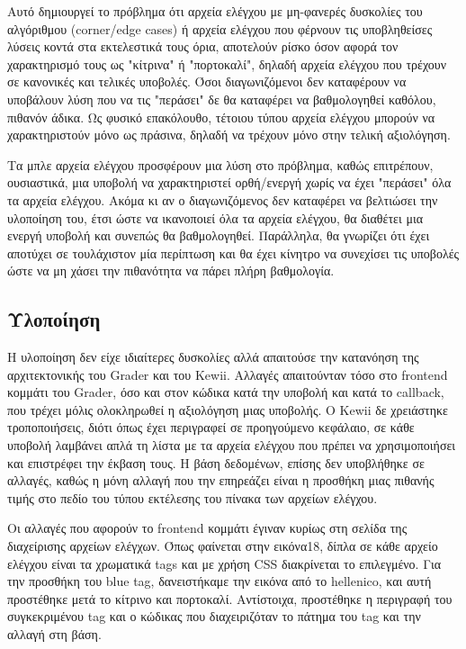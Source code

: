 \documentclass[diploma]{softlab-thesis}
\begin{document}
\bigskip

Αυτό δημιουργεί το πρόβλημα ότι αρχεία ελέγχου με μη-φανερές δυσκολίες του
αλγόριθμου (corner/edge cases) ή αρχεία ελέγχου που φέρνουν τις υποβληθείσες
λύσεις κοντά στα εκτελεστικά τους όρια, αποτελούν ρίσκο όσον αφορά τον
χαρακτηρισμό τους ως "κίτρινα" ή "πορτοκαλί", δηλαδή αρχεία ελέγχου που τρέχουν
σε κανονικές και τελικές υποβολές. Όσοι διαγωνιζόμενοι δεν καταφέρουν να
υποβάλουν λύση που να τις "περάσει" δε θα καταφέρει να βαθμολογηθεί καθόλου,
πιθανόν άδικα. Ως φυσικό επακόλουθο, τέτοιου τύπου αρχεία ελέγχου μπορούν να
χαρακτηριστούν μόνο ως πράσινα, δηλαδή να τρέχουν μόνο στην τελική αξιολόγηση.

\bigskip

Τα μπλε αρχεία ελέγχου προσφέρουν μια λύση στο πρόβλημα, καθώς επιτρέπουν,
ουσιαστικά, μια υποβολή να χαρακτηριστεί ορθή/ενεργή χωρίς να έχει "περάσει"
όλα τα αρχεία ελέγχου. Ακόμα κι αν ο διαγωνιζόμενος δεν καταφέρει να βελτιώσει
την υλοποίηση του, έτσι ώστε να ικανοποιεί όλα τα αρχεία ελέγχου, θα διαθέτει
μια ενεργή υποβολή και συνεπώς θα βαθμολογηθεί. Παράλληλα, θα γνωρίζει ότι
έχει αποτύχει σε τουλάχιστον μία περίπτωση και θα έχει κίνητρο να συνεχίσει τις
υποβολές ώστε να μη χάσει την πιθανότητα να πάρει πλήρη βαθμολογία.

\subsection{Υλοποίηση}

Η υλοποίηση δεν είχε ιδιαίτερες δυσκολίες αλλά απαιτούσε την κατανόηση της
αρχιτεκτονικής του Grader και του Kewii. Αλλαγές απαιτούνταν τόσο στο frontend
κομμάτι του Grader, όσο και στον κώδικα κατά την υποβολή και κατά το callback,
που τρέχει μόλις ολοκληρωθεί η αξιολόγηση μιας υποβολής. Ο Kewii δε χρειάστηκε
τροποποιήσεις, διότι όπως έχει περιγραφεί σε προηγούμενο κεφάλαιο, σε κάθε
υποβολή λαμβάνει απλά τη λίστα με τα αρχεία ελέγχου που πρέπει να
χρησιμοποιήσει και επιστρέφει την έκβαση τους. Η βάση δεδομένων, επίσης δεν
υποβλήθηκε σε αλλαγές, καθώς η μόνη αλλαγή που την επηρεάζει είναι η προσθήκη
μιας πιθανής τιμής στο πεδίο του τύπου εκτέλεσης του πίνακα των αρχείων
ελέγχου.

\bigskip

Οι αλλαγές που αφορούν το frontend κομμάτι έγιναν κυρίως στη σελίδα της διαχείρισης
αρχείων ελέγχων. Όπως φαίνεται στην εικόνα18, δίπλα σε κάθε αρχείο ελέγχου είναι
τα χρωματικά tags και με χρήση CSS διακρίνεται το επιλεγμένο. Για την προσθήκη
του blue tag, δανειστήκαμε την εικόνα από το hellenico, και αυτή προστέθηκε μετά
το κίτρινο και πορτοκαλί. Αντίστοιχα, προστέθηκε η περιγραφή του συγκεκριμένου
tag και ο κώδικας που διαχειριζόταν το πάτημα του tag και την αλλαγή στη βάση.
\end{document}
